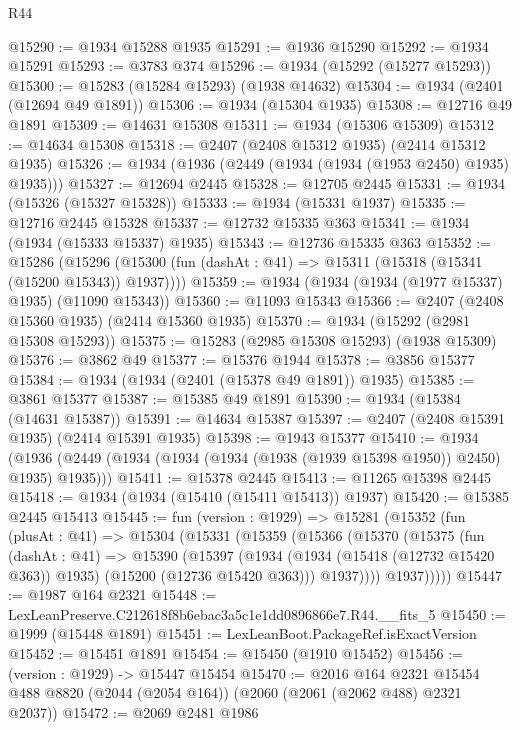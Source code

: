 \begin{lexlean}{R44}
\begin{coremodule}
@15290 := @1934 @15288 @1935
@15291 := @1936 @15290
@15292 := @1934 @15291
@15293 := @3783 @374
@15296 := @1934 (@15292 (@15277 @15293))
@15300 := @15283 (@15284 @15293) (@1938 @14632)
@15304 := @1934 (@2401 (@12694 @49 @1891))
@15306 := @1934 (@15304 @1935)
@15308 := @12716 @49 @1891
@15309 := @14631 @15308
@15311 := @1934 (@15306 @15309)
@15312 := @14634 @15308
@15318 := @2407 (@2408 @15312 @1935) (@2414 @15312 @1935)
@15326 := @1934 (@1936 (@2449 (@1934 (@1934 (@1953 @2450) @1935) @1935)))
@15327 := @12694 @2445
@15328 := @12705 @2445
@15331 := @1934 (@15326 (@15327 @15328))
@15333 := @1934 (@15331 @1937)
@15335 := @12716 @2445 @15328
@15337 := @12732 @15335 @363
@15341 := @1934 (@1934 (@15333 @15337) @1935)
@15343 := @12736 @15335 @363
@15352 := @15286
    (@15296 (@15300 (fun (dashAt : @41) => @15311 (@15318 (@15341 (@15200 @15343)) @1937))))
@15359 := @1934 (@1934 (@1934 (@1977 @15337) @1935) (@11090 @15343))
@15360 := @11093 @15343
@15366 := @2407 (@2408 @15360 @1935) (@2414 @15360 @1935)
@15370 := @1934 (@15292 (@2981 @15308 @15293))
@15375 := @15283 (@2985 @15308 @15293) (@1938 @15309)
@15376 := @3862 @49
@15377 := @15376 @1944
@15378 := @3856 @15377
@15384 := @1934 (@1934 (@2401 (@15378 @49 @1891)) @1935)
@15385 := @3861 @15377
@15387 := @15385 @49 @1891
@15390 := @1934 (@15384 (@14631 @15387))
@15391 := @14634 @15387
@15397 := @2407 (@2408 @15391 @1935) (@2414 @15391 @1935)
@15398 := @1943 @15377
@15410 := @1934
    (@1936 (@2449 (@1934 (@1934 (@1934 (@1938 (@1939 @15398 @1950)) @2450) @1935) @1935)))
@15411 := @15378 @2445
@15413 := @11265 @15398 @2445
@15418 := @1934 (@1934 (@15410 (@15411 @15413)) @1937)
@15420 := @15385 @2445 @15413
@15445 := fun (version : @1929) =>
  @15281
    (@15352
      (fun (plusAt : @41) =>
      @15304
        (@15331
          (@15359
            (@15366
              (@15370
                (@15375
                  (fun (dashAt : @41) =>
                  @15390
                    (@15397
                      (@1934
                        (@1934 (@15418 (@12732 @15420 @363)) @1935)
                        (@15200 (@12736 @15420 @363)))
                      @1937))))
              @1937)))))
@15447 := @1987 @164 @2321
@15448 := LexLeanPreserve.C212618f8b6ebac3a5c1e1dd0896866e7.R44.__fits_5
@15450 := @1999 (@15448 @1891)
@15451 := LexLeanBoot.PackageRef.isExactVersion
@15452 := @15451 @1891
@15454 := @15450 (@1910 @15452)
@15456 := (version : @1929) -> @15447 @15454
@15470 := @2016
    @164
    @2321
    @15454
    @488
    @8820
    (@2044 (@2054 @164))
    (@2060 (@2061 (@2062 @488) @2321 @2037))
@15472 := @2069 @2481 @1986

\end{coremodule}
\end{lexlean}

